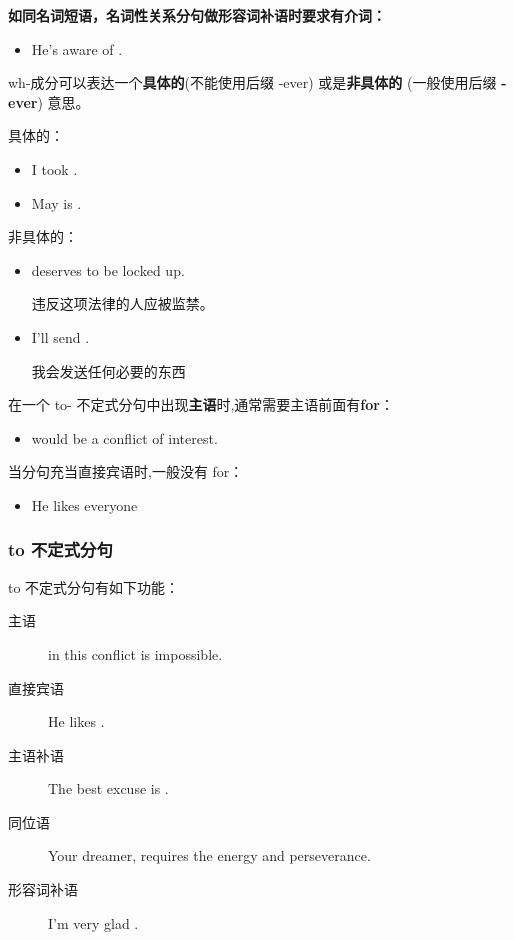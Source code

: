 \textbf{如同名词短语，名词性关系分句做形容词补语时要求有介词：}
\begin{itemize}
\item He's aware of .
\end{itemize}

wh-成分可以表达一个\textbf{具体的}(不能使用后缀 -ever) 或是\textbf{非具体的}
(一般使用后缀 \textbf{-ever}) 意思。

具体的：
\begin{itemize}
\item I took .
\item May is .
\end{itemize}


非具体的：
\begin{itemize}
\item {} deserves to be locked up.

  违反这项法律的人应被监禁。
\item I'll send .

  我会发送任何必要的东西
\end{itemize}

在一个 to- 不定式分句中出现\textbf{主语}时,通常需要主语前面有\textbf{for}：
\begin{itemize}
\item {} would be a conflict of interest.
\end{itemize}
当分句充当直接宾语时,一般没有 for：
\begin{itemize}
\item He likes everyone 
\end{itemize}

\subsubsection{to 不定式分句}

to 不定式分句有如下功能：
\begin{description}
\item[主语]  in this conflict is impossible.
\item[直接宾语] He likes .
\item[主语补语] The best excuse is .

\item[同位语] Your dreamer,  requires the
  energy and perseverance.

\item[形容词补语] I'm very glad .
\end{description}

